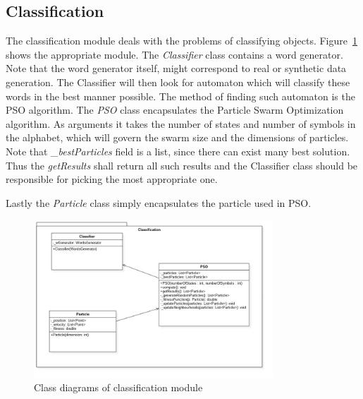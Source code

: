 \documentclass{article}
\begin{document}

\newpage
\subsection{Classification}

The classification module deals with the problems of classifying objects. Figure~\ref{fig:classification_class} shows the appropriate module. The \textit{Classifier} class contains a word generator. Note that the word generator itself, might correspond to real or synthetic data generation. The Classifier will then look for automaton which will classify these words in the best manner possible. The method of finding such automaton is the PSO algorithm. The \textit{PSO} class encapsulates the Particle Swarm Optimization algorithm. As arguments it takes the number of states and number of symbols in the alphabet, which will govern the swarm size and the dimensions of particles. Note that \textit{\_bestParticles} field is a list, since there can exist many best solution. Thus the \textit{getResults} shall return all such results and the Classifier class should be responsible for picking the most appropriate one.

Lastly the \textit{Particle} class simply encapsulates the particle used in PSO.

%
%
\begin{figure}[H]
	\centering
	\includegraphics[width=0.8\textwidth]{images/classification_class.jpg}
    \caption{Class diagrams of classification module}
    \label{fig:classification_class}
\end{figure}



\newpage
\end{document}
